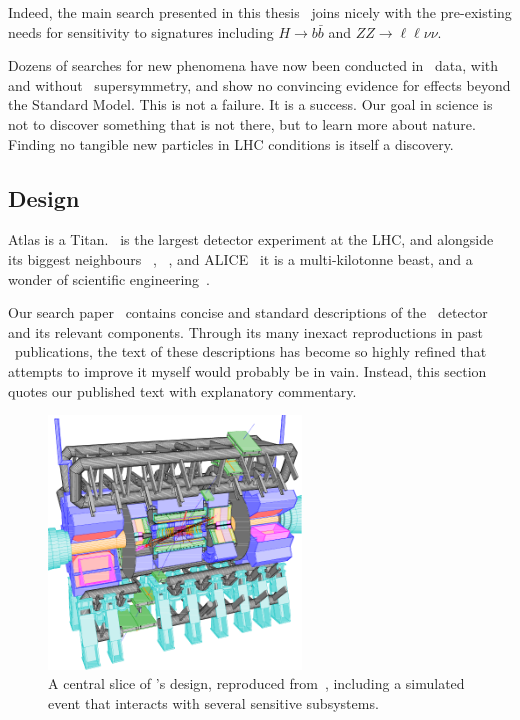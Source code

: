 Indeed, the main search presented in this thesis~\cite{atlas2022searches}
joins nicely with the pre-existing needs for sensitivity to signatures
including
$H \to b\bar b$
and
$ZZ \to \ell\ell\nu\nu$.

Dozens of searches for new phenomena have now been conducted in \atlas\ data,
with~\cite{
ATL-PHYS-PUB-2022-013
}
and without~\cite{
ATL-PHYS-PUB-2022-007,
ATL-PHYS-PUB-2022-012,
ATL-PHYS-PUB-2022-036,
ATL-PHYS-PUB-2022-034
} supersymmetry,
and show no convincing evidence for effects beyond the Standard Model.
This is not a failure. It is a success.
Our goal in science is not to discover something that is not there,
but to learn more about nature.
Finding no tangible new particles in LHC conditions is itself a discovery.


\subsection{Design}
Atlas is a Titan.
\atlas\ is the largest detector experiment at the LHC,
and alongside its biggest neighbours
\cms~\cite{cms2008experiment},
\lhcb~\cite{lhcb2008experiment},
and ALICE~\cite{alice2008experiment}
it is a multi-kilotonne beast,
and a wonder of scientific engineering~\cite{
atlas1994proposal,
atlas2008experiment,
atlas1999design1,
atlas1999design2
}.

Our search paper~\cite{atlas2022searches} contains concise and standard
descriptions of the \atlas\ detector and its relevant components.
Through its many inexact reproductions in past \atlas\ publications, the text
of these descriptions has become so highly refined that attempts to improve
it myself would probably be in vain.
Instead, this section quotes our published text with explanatory commentary.

\begin{figure}[tp]
\centering
\includegraphics[width=0.6\textwidth]{figures/atlas_cutaway_volume_1.pdf}
\caption[
A central slice of \atlas's design
]{%
A central slice of \atlas's design, reproduced from~\cite{atlas1999design1},
including a simulated event that interacts with several sensitive subsystems.
}
\label{fig:atlas_cutaway}
\end{figure}

